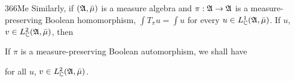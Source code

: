 \spheader 366Me
Similarly, if $(\frak A,\bar\mu)$ is a measure algebra and
$\pi:\frak A\to\frak A$ is a measure-preserving Boolean homomorphism,
$\int T_{\pi}u=\int u$ for every $u\in L^1_{\Bbb C}(\frak A,\bar\mu)$.
If $u$, $v\in L^2_{\Bbb C}(\frak A,\bar\mu)$, then


\noindent If $\pi$ is a measure-preserving Boolean
automorphism, we shall have


\noindent for all $u$, $v\in L^2_{\Bbb C}(\frak A,\bar\mu)$.

